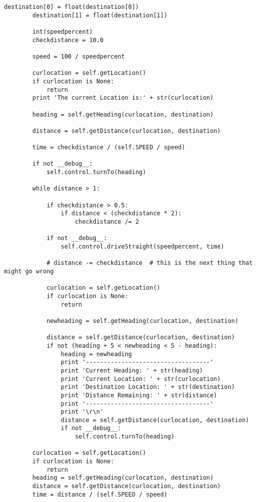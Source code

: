 \begin{lstlisting}[style=custompython, label=Algorithms-code, caption=full code for the Algorithms class]
        destination[0] = float(destination[0])
        destination[1] = float(destination[1])

        int(speedpercent)
        checkdistance = 10.0

        speed = 100 / speedpercent

        curlocation = self.getLocation()
        if curlocation is None:
            return
        print 'The current Location is:' + str(curlocation)

        heading = self.getHeading(curlocation, destination)

        distance = self.getDistance(curlocation, destination)

        time = checkdistance / (self.SPEED / speed)

        if not __debug__:
            self.control.turnTo(heading)

        while distance > 1:

            if checkdistance > 0.5:
                if distance < (checkdistance * 2):
                    checkdistance /= 2

            if not __debug__:
                self.control.driveStraight(speedpercent, time)

            # distance -= checkdistance  # this is the next thing that might go wrong

            curlocation = self.getLocation()
            if curlocation is None:
                return

            newheading = self.getHeading(curlocation, destination)

            distance = self.getDistance(curlocation, destination)
            if not (heading + 5 < newheading < 5 - heading):
                heading = newheading
                print '-----------------------------------'
                print 'Current Heading: ' + str(heading)
                print 'Current Location: ' + str(curlocation)
                print 'Destination Location: ' + str(destination)
                print 'Distance Remaining: ' + str(distance)
                print '-----------------------------------'
                print '\r\n'
                distance = self.getDistance(curlocation, destination)
                if not __debug__:
                    self.control.turnTo(heading)

        curlocation = self.getLocation()
        if curlocation is None:
            return
        heading = self.getHeading(curlocation, destination)
        distance = self.getDistance(curlocation, destination)
        time = distance / (self.SPEED / speed)


\end{lstlisting}
